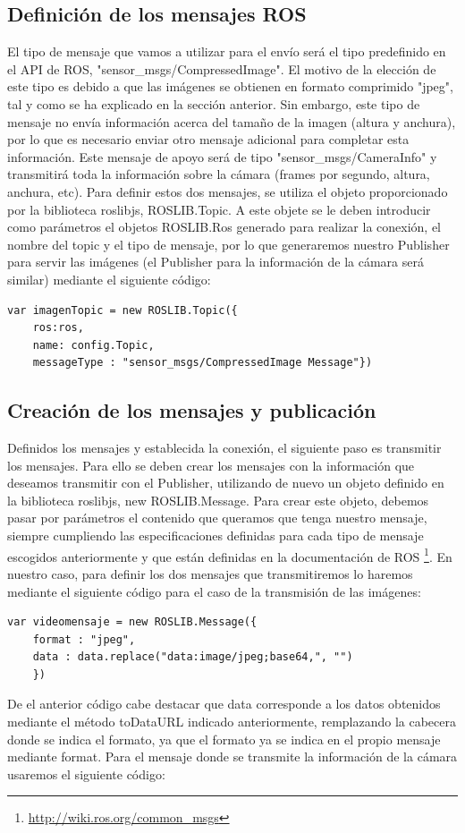 \subsection{Definición de los mensajes ROS}
El tipo de mensaje que vamos a utilizar para el envío será el tipo predefinido en el API de ROS, "sensor\_msgs/CompressedImage". El motivo de la elección de este tipo es debido a que las imágenes se obtienen en formato comprimido "jpeg", tal y como se ha explicado en la sección anterior. Sin embargo, este tipo de mensaje no envía información acerca del tamaño de la imagen (altura y anchura), por lo que es necesario enviar otro mensaje adicional para completar esta información. Este mensaje de apoyo será de tipo "sensor\_msgs/CameraInfo" y transmitirá toda la información sobre la cámara (frames por segundo, altura, anchura, etc). Para definir estos dos mensajes, se utiliza el objeto proporcionado por la biblioteca roslibjs, ROSLIB.Topic. A este objete se le deben introducir como parámetros el objetos ROSLIB.Ros generado para realizar la conexión, el nombre del topic y el tipo de mensaje, por lo que generaremos nuestro Publisher para servir las imágenes (el Publisher para la información de la cámara será similar) mediante el siguiente código:
\begin{lstlisting}[frame=single]
var imagenTopic = new ROSLIB.Topic({
	ros:ros, 
	name: config.Topic, 
	messageType : "sensor_msgs/CompressedImage Message"})

\end{lstlisting}

\subsection{Creación de los mensajes y publicación}
Definidos los mensajes y establecida la conexión, el siguiente paso es transmitir los mensajes. Para ello se deben crear los mensajes con la información que deseamos transmitir con el Publisher, utilizando de nuevo un objeto definido en la biblioteca roslibjs, new ROSLIB.Message. Para crear este objeto, debemos pasar por parámetros el contenido que queramos que tenga nuestro mensaje, siempre cumpliendo las especificaciones definidas para cada tipo de mensaje escogidos anteriormente y que están definidas en la documentación de ROS  \footnote{\url{http://wiki.ros.org/common_msgs}}. En nuestro caso, para definir los dos mensajes que transmitiremos lo haremos mediante el siguiente código para el caso de la transmisión de las imágenes:
\begin{lstlisting}[frame=single]
 var videomensaje = new ROSLIB.Message({
 	format : "jpeg", 
	data : data.replace("data:image/jpeg;base64,", "")
	})

\end{lstlisting}
De el anterior código cabe destacar que data corresponde a los datos obtenidos mediante el método toDataURL indicado anteriormente, remplazando la cabecera donde se indica el formato, ya que el formato ya se indica en el propio mensaje mediante format.  Para el mensaje donde se transmite la información de la cámara usaremos el siguiente código:

